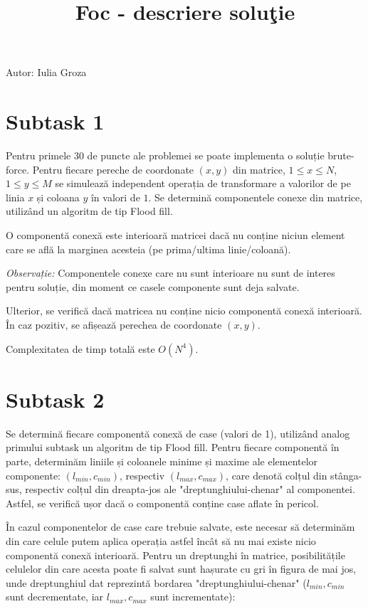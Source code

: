 \documentclass[ro]{problem}
\title{Foc - descriere soluţie}
\begin{document}
\maketitle

Autor: Iulia Groza

\section{Subtask 1}
\noindent Pentru primele 30 de puncte ale problemei se poate implementa o soluție brute-force. Pentru fiecare pereche de coordonate $(x, y)$ din matrice, $1 \leq x \leq N$, $1 \leq y \leq M$ se simulează independent operația de transformare a valorilor de pe linia $x$ și coloana $y$ în valori de $1$. Se determină componentele conexe din matrice, utilizând un algoritm de tip Flood fill. 

\noindent O componentă conexă este interioară matricei dacă nu conține niciun element care se află la marginea acesteia (pe prima/ultima linie/coloană).

\emph{Observație:} Componentele conexe care nu sunt interioare nu sunt de interes pentru soluție, din moment ce casele componente sunt deja salvate.

\noindent Ulterior, se verifică dacă matricea nu conține nicio componentă conexă interioară. În caz pozitiv, se afișează perechea de coordonate $(x, y)$.

\noindent Complexitatea de timp totală este $O(N^4)$.

\section{Subtask 2}
\noindent Se determină fiecare componentă conexă de case (valori de 1), utilizând analog primului subtask un algoritm de tip Flood fill. Pentru fiecare componentă în parte, determinăm liniile și coloanele minime și maxime ale elementelor componente: $(l_{min}, c_{min})$, respectiv  $(l_{max}, c_{max})$, care denotă colțul din stânga-sus, respectiv colțul din dreapta-jos ale "dreptunghiului-chenar" al componentei. Astfel, se verifică ușor dacă o componentă conține case aflate în pericol. 

\noindent În cazul componentelor de case care trebuie salvate, este necesar să determinăm din care celule putem aplica operația astfel încât să nu mai existe nicio componentă conexă interioară. Pentru un dreptunghi în matrice, posibilitățile celulelor din care acesta poate fi salvat sunt hașurate cu gri în figura de mai jos, unde dreptunghiul dat reprezintă bordarea "dreptunghiului-chenar" ($l_{min}, c_{min}$ sunt decrementate, iar $l_{max}, c_{max}$ sunt incrementate):
\end{document}
